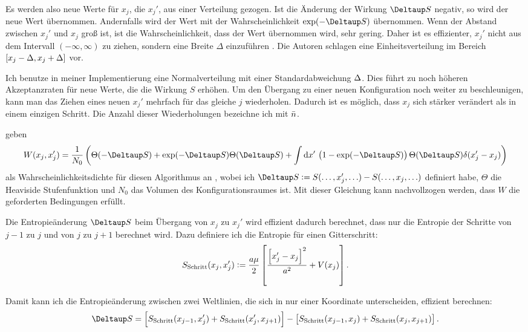 Es werden also neue Werte für $x_j$, die $x_j'$, aus einer Verteilung gezogen.
Ist die Änderung der Wirkung $\Deltaup S$ negativ, so wird der neue Wert
übernommen. Andernfalls wird der Wert mit der Wahrscheinlichkeit
$\exp(-\Deltaup S)$ übernommen. Wenn der Abstand zwischen $x_j'$ und $x_j$ groß
ist, ist die Wahrscheinlichkeit, dass der Wert übernommen wird, sehr gering.
Daher ist es effizienter, $x_j'$ nicht aus dem Intervall $(-\infty, \infty)$ zu
ziehen, sondern eine Breite $\Delta$ einzuführen
\parencite[439]{Creutz/Statistical_Approach_QM}. Die Autoren schlagen eine
Einheitsverteilung im Bereich $[x_j - \Delta, x_j + \Delta]$ vor.

Ich benutze in meiner Implementierung eine Normalverteilung mit einer
Standardabweichung $\Delta$. Dies führt zu noch höheren Akzeptanzraten für
neue Werte, die die Wirkung $S$ erhöhen. Um den Übergang zu einer neuen
Konfiguration noch weiter zu beschleunigen, kann man das Ziehen eines neuen
$x_j'$ mehrfach für das gleiche $j$ wiederholen. Dadurch ist es möglich, dass
$x_j$ sich stärker verändert als in einem einzigen Schritt. Die Anzahl dieser
Wiederholungen bezeichne ich mit $\bar n$.

\citeauthor{Creutz/Statistical_Approach_QM} geben
\[
    W(x_j, x_j') = \frac1{N_0} \del{
        \Theta(-\Deltaup S) + \exp(- \Deltaup S) \Theta(\Deltaup S)
        + \int \dif x' \, \del{
            1 - \exp(-\Deltaup S)
        } \Theta(\Deltaup S) \delta(x_j' - x_j)
    }
\]
als Wahrscheinlichkeitsdichte für diesen Algorithmus an
\parencite[(3.28)]{Creutz/Statistical_Approach_QM}, wobei ich $\Deltaup S :=
S(\ldots, x_j', \ldots) - S(\ldots, x_j, \ldots)$ definiert habe, $\Theta$ die
Heaviside Stufenfunktion und $N_0$ das Volumen des Konfigurationsraumes ist.
Mit dieser Gleichung kann nachvollzogen werden, dass $W$ die geforderten
Bedingungen erfüllt.

Die Entropieänderung $\Deltaup S$ beim Übergang von $x_j$ zu $x_j'$ wird
effizient dadurch berechnet, dass nur die Entropie der Schritte von $j-1$ zu
$j$ und von $j$ zu $j+1$ berechnet wird. Dazu definiere ich die Entropie für
einen Gitterschritt:
\[
    S_\text{Schritt}(x_j, x_j') := \frac{\timestep \mass}2 \sbr{
    \frac{\sbr{x_j' - x_j}^2}{\timestep^2} + V(x_j)}.
\]

Damit kann ich die Entropieänderung zwischen zwei Weltlinien, die sich in nur
einer Koordinate unterscheiden, effizient berechnen:
\[
    \Deltaup S =
    \sbr{S_\text{Schritt}(x_{j-1}, x_{j}') + S_\text{Schritt}(x_{j}', x_{j+1})}
    -
    \sbr{S_\text{Schritt}(x_{j-1}, x_{j}) + S_\text{Schritt}(x_{j}, x_{j+1})}.
\]

